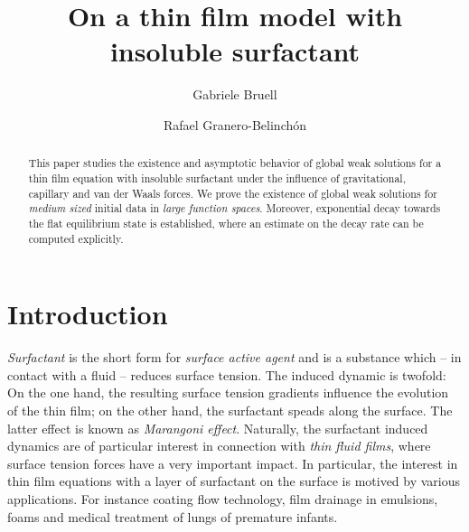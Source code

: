 \documentclass[reqno,11pt]{amsart}
\title[]{On a thin film model with insoluble surfactant}
\author[G. Bruell]{Gabriele Bruell}
\author[R. Granero-Belinch\'{o}n]{Rafael Granero-Belinch\'{o}n}
\begin{document}
\begin{abstract} This paper studies the existence and asymptotic behavior of global weak solutions for a thin film equation with insoluble surfactant under the influence of gravitational, capillary and van der Waals forces. We prove the existence of global weak solutions for \emph{medium sized} initial data in \emph{large function spaces}. Moreover, exponential decay towards the flat equilibrium state is established, where an estimate on the decay rate can be computed explicitly. 
\end{abstract}

\maketitle 



\section{Introduction}
\allowdisplaybreaks

\emph{Surfactant} is the short form for \emph{surface active agent} and is a substance which -- in contact with a fluid -- reduces surface tension. The induced dynamic is twofold: On the one hand, the resulting surface tension gradients influence the evolution of the thin film; on the other hand, the surfactant speads along the surface. The latter effect is known as \emph{Marangoni effect}. Naturally, the surfactant induced dynamics are of particular interest in connection with \emph{thin fluid films}, where surface tension forces have a very important impact. In particular, the interest in thin film equations with a layer of surfactant on the surface is motived by various applications. For instance coating flow technology, film drainage in emulsions, foams and medical treatment of lungs of premature infants. 

\medskip
\end{document}
